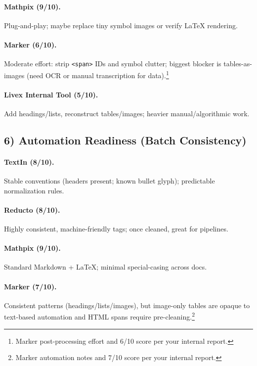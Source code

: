 \documentclass[11pt,a4paper]{article}
\begin{document}
\paragraph{Mathpix (9/10).}
Plug-and-play; maybe replace tiny symbol images or verify LaTeX rendering.

\paragraph{Marker (6/10).}
Moderate effort: strip \verb|<span>| IDs and symbol clutter; biggest blocker is tables-as-images (need OCR or manual transcription for data).\footnote{Marker post-processing effort and 6/10 score per your internal report.}

\paragraph{Livex Internal Tool (5/10).}
Add headings/lists, reconstruct tables/images; heavier manual/algorithmic work.

\subsection*{6) Automation Readiness (Batch Consistency)}

\paragraph{TextIn (8/10).}
Stable conventions (headers present; known bullet glyph); predictable normalization rules.

\paragraph{Reducto (8/10).}
Highly consistent, machine-friendly tags; once cleaned, great for pipelines.

\paragraph{Mathpix (9/10).}
Standard Markdown + LaTeX; minimal special-casing across docs.

\paragraph{Marker (7/10).}
Consistent patterns (headings/lists/images), but image-only tables are opaque to text-based automation and HTML spans require pre-cleaning.\footnote{Marker automation notes and 7/10 score per your internal report.}
\end{document}
